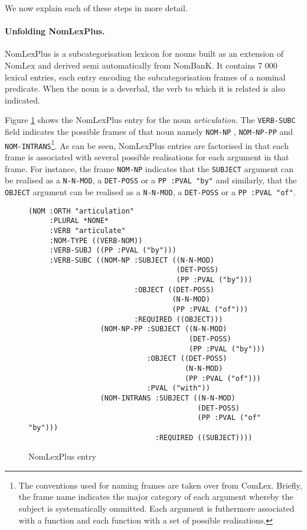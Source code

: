 \documentclass[twocolumn,10pt]{article}
\begin{document}
We now explain each of these steps in more detail. 

\paragraph{Unfolding NomLexPlus.}
NomLexPlus is a subcategorisation lexicon for nouns built as an
extension of NomLex and derived semi automatically from NomBanK. It
contains 7 000 lexical entries, each entry encoding the
subcategorisation frames of a nominal predicate. When the noun is a
deverbal, the verb to which it is related is also indicated.

Figure \ref{fig:nlpentry} shows the NomLexPlus entry for the noun {\it
  articulation}. The \verb!VERB-SUBC! field indicates the possible
frames of that noun namely \verb!NOM-NP! , \verb!NOM-NP-PP! and
\verb!NOM-INTRANS!\footnote{The conventions used for naming frames are
  taken over from ComLex. Briefly, the frame name indicates the major
  category of each argument whereby the subject is systematically
  ommitted. Each argument is futhermore associated with a function and each
  function with a set of possible realisations.}.  As can be seen,
NomLexPlus entries are factorised in that each frame is associated
with several possible realisations for each argument in that
frame. For instance, the frame \verb!NOM-NP! indicates that the
\verb!SUBJECT! argument can be realised as a \verb!N-N-MOD!, a
\verb!DET-POSS! or a \verb!PP :PVAL "by"! and similarly, that the
\verb!OBJECT! argument can be realised as a \verb!N-N-MOD!, a
\verb!DET-POSS! or a \verb!PP :PVAL "of"!.


\begin{figure}
\begin{scriptsize}
\begin{verbatim}
(NOM :ORTH "articulation"
     :PLURAL *NONE*
     :VERB "articulate"
     :NOM-TYPE ((VERB-NOM))
     :VERB-SUBJ ((PP :PVAL ("by")))
     :VERB-SUBC ((NOM-NP :SUBJECT ((N-N-MOD)
                                   (DET-POSS)
                                   (PP :PVAL ("by")))
                         :OBJECT ((DET-POSS)
                                  (N-N-MOD)
                                  (PP :PVAL ("of")))
                         :REQUIRED ((OBJECT)))
                 (NOM-NP-PP :SUBJECT ((N-N-MOD)
                                      (DET-POSS)
                                      (PP :PVAL ("by")))
                            :OBJECT ((DET-POSS)
                                     (N-N-MOD)
                                     (PP :PVAL ("of")))
                            :PVAL ("with"))
                 (NOM-INTRANS :SUBJECT ((N-N-MOD)
                                        (DET-POSS)
                                        (PP :PVAL ("of" "by")))
                              :REQUIRED ((SUBJECT))))
\end{verbatim}
\end{scriptsize}
\caption{NomLexPlus entry \label{fig:nlpentry}}
\end{figure}
\end{document}
